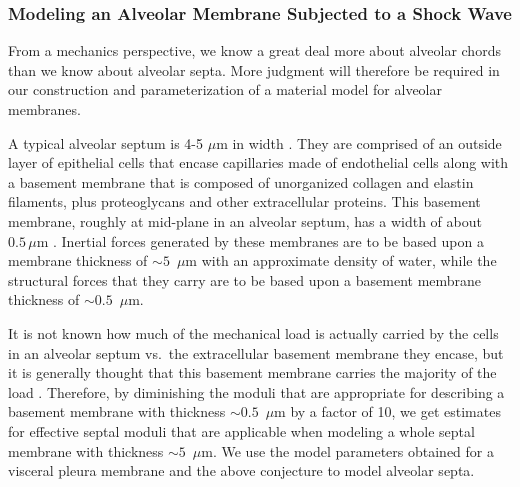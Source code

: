 \subsubsection{Modeling an Alveolar Membrane Subjected to a Shock Wave}
  
From a mechanics perspective, we know a great deal more about alveolar chords than we know about alveolar septa.  More judgment will therefore be required in our construction and parameterization of a material model for alveolar membranes.  

A typical alveolar septum is 4-5 $\mu$m in width \cite{Sukietal11}.  They are comprised of an outside layer of epithelial cells that encase capillaries made of endothelial cells along with a basement membrane that is composed of unorganized collagen and elastin filaments, plus proteoglycans and other extracellular proteins.  This basement membrane, roughly at mid-plane in an alveolar septum, has a width of about $0.5 \, \mu$m \cite{RoanWaters11}.  Inertial forces generated by these membranes are to be based upon a membrane thickness of $\sim\!\!5$~$\mu$m with an approximate density of water, while the structural forces that they carry are to be based upon a basement membrane thickness of $\sim\!\! 0.5$~$\mu$m.  

It is not known how much of the mechanical load is actually carried by the cells in an alveolar septum vs.\ the extracellular basement membrane they encase, but it is generally thought that this basement membrane carries the majority of the load \cite{Sukietal11}.  Therefore, by diminishing the moduli that are appropriate for describing a basement membrane with thickness $\sim\!\! 0.5$~$\mu$m by a factor of 10, we get estimates for effective septal moduli that are applicable when modeling a whole septal membrane with thickness $\sim\!\! 5$~$\mu$m.  We use the model parameters obtained for a visceral pleura membrane \cite{Freedetal17} and the above conjecture to model alveolar septa.

